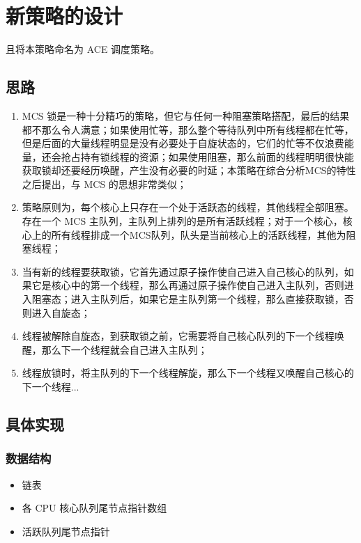 \documentclass[UTF8]{ctexart}
\begin{document}
\section{新策略的设计}

且将本策略命名为 ACE 调度策略。

\subsection{思路}

\begin{enumerate}
    \item MCS 锁是一种十分精巧的策略，但它与任何一种阻塞策略搭配，最后的结果都不那么令人满意；如果使用忙等，那么整个等待队列中所有线程都在忙等，但是后面的大量线程明显是没有必要处于自旋状态的，它们的忙等不仅浪费能量，还会抢占持有锁线程的资源；如果使用阻塞，那么前面的线程明明很快能获取锁却还要经历唤醒，产生没有必要的时延；本策略在综合分析MCS的特性之后提出，与 MCS 的思想非常类似；
    \item 策略原则为，每个核心上只存在一个处于活跃态的线程，其他线程全部阻塞。存在一个 MCS 主队列，主队列上排列的是所有活跃线程；对于一个核心，核心上的所有线程排成一个MCS队列，队头是当前核心上的活跃线程，其他为阻塞线程；
    \item 当有新的线程要获取锁，它首先通过原子操作使自己进入自己核心的队列，如果它是核心中的第一个线程，那么再通过原子操作使自己进入主队列，否则进入阻塞态；进入主队列后，如果它是主队列第一个线程，那么直接获取锁，否则进入自旋态；
    \item 线程被解除自旋态，到获取锁之前，它需要将自己核心队列的下一个线程唤醒，那么下一个线程就会自己进入主队列；
    \item 线程放锁时，将主队列的下一个线程解旋，那么下一个线程又唤醒自己核心的下一个线程...
\end{enumerate}

\newpage

\subsection{具体实现}

\subsubsection{数据结构}

\begin{itemize}
    \item 链表
    \item 各 CPU 核心队列尾节点指针数组
    \item 活跃队列尾节点指针
\end{itemize}
\end{document}
